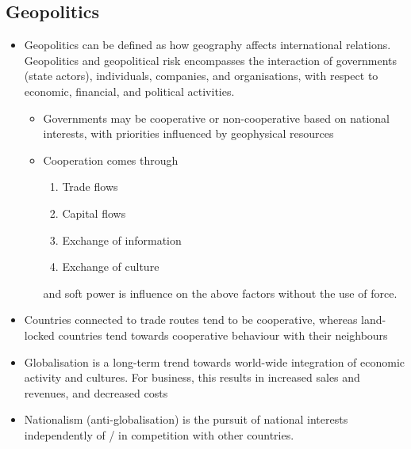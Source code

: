 \documentclass[../notes_compiled.tex]{subfiles}
\begin{document}
\subsection{Geopolitics}

\begin{itemize}
\item Geopolitics can be defined as how geography affects international relations. Geopolitics and geopolitical risk encompasses the interaction of governments (state actors), individuals, companies, and organisations, with respect to economic, financial, and political activities.
\begin{itemize}
\item Governments may be cooperative or non-cooperative based on national interests, with priorities influenced by geophysical resources
\item Cooperation comes through 
\begin{enumerate}
\item Trade flows
\item Capital flows
\item Exchange of information
\item Exchange of culture
\end{enumerate}
and soft power is influence on the above factors without the use of force.
\end{itemize}
\item Countries connected to trade routes tend to be cooperative, whereas land-locked countries tend towards cooperative behaviour with their neighbours
\item Globalisation is a long-term trend towards world-wide integration of economic activity and cultures. For business, this results in increased sales and revenues, and decreased costs
\item Nationalism (anti-globalisation) is the pursuit of national interests independently of / in competition with other countries.


\end{itemize}
\end{document}
